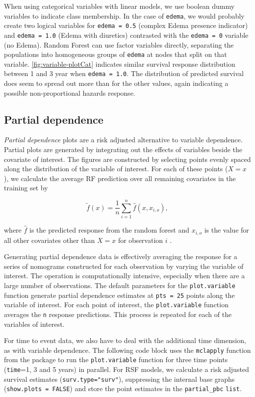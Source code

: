 \documentclass[article, nojss]{jss}
\begin{document}
When using categorical variables with linear models, we use boolean
dummy variables to indicate class membership. In the case of
\texttt{edema}, we would probably create two logical variables for
\texttt{edema\ =\ 0.5} (complex Edema presence indicator) and
\texttt{edema\ =\ 1.0} (Edema with diuretics) contrasted with the
\texttt{edema\ =\ 0} variable (no Edema). Random Forest can use factor
variables directly, separating the populations into homogeneous groups
of \texttt{edema} at nodes that split on that variable.
\autoref{fig:variable-plotCat} indicates similar survival response
distribution between 1 and 3 year when \texttt{edema\ =\ 1.0}. The
distribution of predicted survival does seem to spread out more than for
the other values, again indicating a possible non-proportional hazards
response.

\subsection{Partial dependence}\label{partial-dependence}

\emph{Partial dependence} plots are a risk adjusted alternative to
variable dependence. Partial plots are generated by integrating out the
effects of variables beside the covariate of interest. The figures are
constructed by selecting points evenly spaced along the distribution of
the variable of interest. For each of these points (\(X = x\)), we
calculate the average RF prediction over all remaining covariates in the
training set by

\[
\tilde{f}(x) = \frac{1}{n} \sum_{i = 1}^n \hat{f}(x, x_{i, o}),
\label{E:partial}
\]

where \(\hat{f}\) is the predicted response from the random forest and
\(x_{i, o}\) is the value for all other covariates other than \(X = x\)
for observation \(i\) \citep{Friedman:2000}.

Generating partial dependence data is effectively averaging the response
for a series of nomograms constructed for each observation by varying
the variable of interest. The operation is computationally intensive,
especially when there are a large number of observations. The default
parameters for the \texttt{plot.variable} function generate partial
dependence estimates at \texttt{pts\ =\ 25} points along the variable of
interest. For each point of interest, the \texttt{plot.variable}
function averages the \texttt{n} response predictions. This process is
repeated for each of the variables of interest.

For time to event data, we also have to deal with the additional time
dimension, as with variable dependence. The following code block uses
the \texttt{mclapply} function from the  package to run
the \texttt{plot.variable} function for three time points
(\texttt{time}=1, 3 and 5 years) in parallel. For RSF models, we
calculate a risk adjusted survival estimates
(\texttt{surv.type="surv"}), suppressing the internal base graphs
(\texttt{show.plots\ =\ FALSE}) and store the point estimates in the
\texttt{partial\_pbc} \texttt{list}.
\end{document}

